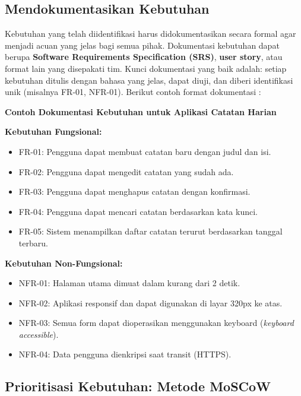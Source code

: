 \subsection{Mendokumentasikan Kebutuhan}

Kebutuhan yang telah diidentifikasi harus didokumentasikan secara formal agar menjadi acuan yang jelas bagi semua pihak. Dokumentasi kebutuhan dapat berupa \textbf{Software Requirements Specification (SRS)}, \textbf{user story}, atau format lain yang disepakati tim. Kunci dokumentasi yang baik adalah: setiap kebutuhan ditulis dengan bahasa yang jelas, dapat diuji, dan diberi identifikasi unik (misalnya FR-01, NFR-01). Berikut contoh format dokumentasi \cite{webdevLearn}:

\begin{contoh}
\textbf{Contoh Dokumentasi Kebutuhan untuk Aplikasi Catatan Harian}

\textbf{Kebutuhan Fungsional:}
\begin{itemize}
  \item FR-01: Pengguna dapat membuat catatan baru dengan judul dan isi.
  \item FR-02: Pengguna dapat mengedit catatan yang sudah ada.
  \item FR-03: Pengguna dapat menghapus catatan dengan konfirmasi.
  \item FR-04: Pengguna dapat mencari catatan berdasarkan kata kunci.
  \item FR-05: Sistem menampilkan daftar catatan terurut berdasarkan tanggal terbaru.
\end{itemize}

\textbf{Kebutuhan Non-Fungsional:}
\begin{itemize}
  \item NFR-01: Halaman utama dimuat dalam kurang dari 2 detik.
  \item NFR-02: Aplikasi responsif dan dapat digunakan di layar 320px ke atas.
  \item NFR-03: Semua form dapat dioperasikan menggunakan keyboard (\textit{keyboard accessible}).
  \item NFR-04: Data pengguna dienkripsi saat transit (HTTPS).
\end{itemize}
\end{contoh}

\subsection{Prioritisasi Kebutuhan: Metode MoSCoW}

